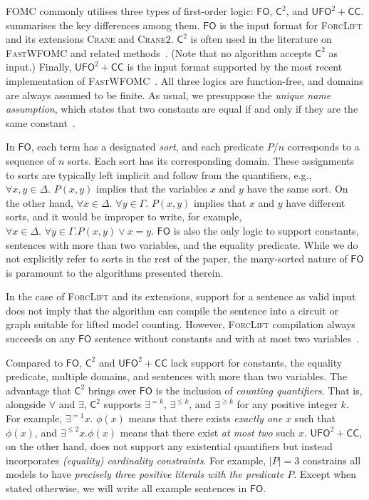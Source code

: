 \documentclass[a4paper,UKenglish,cleveref,autoref,table]{lipics-v2021}
\newcommand{\Cranetwo}{\textsc{Crane2}}
\newcommand{\Ctwo}{$\mathsf{C}^{2}$}
\newcommand{\FO}{$\mathsf{FO}$}
\newcommand{\UFO}{$\mathsf{UFO}^{2} + \mathsf{CC}$}
\begin{document}
FOMC commonly utilises three types of first-order logic: \FO{}, \Ctwo{}, and
\UFO{}.  summarises the key differences among them. \FO{} is
the input format for \textsc{ForcLift} and its extensions \textsc{Crane} and
\Cranetwo{}. \Ctwo{} is often used in the literature on \textsc{FastWFOMC} and
related methods~\cite{DBLP:journals/jair/Kuzelka21,DBLP:conf/aaai/MalhotraS22}.
(Note that no algorithm accepts \Ctwo{} as input.) Finally, \UFO{} is the input
format supported by the most recent implementation of
\textsc{FastWFOMC}~\cite{DBLP:conf/kr/TothK24}. All three logics are
function-free, and domains are always assumed to be finite. As usual, we
presuppose the \emph{unique name assumption}, which states that two constants
are equal if and only if they are the same constant~\cite{DBLP:books/aw/RN2020}.

In \FO{}, each term has a designated \emph{sort}, and each predicate $P/n$
corresponds to a sequence of $n$ sorts. Each sort has its corresponding domain.
These assignments to sorts are typically left implicit and follow from the
quantifiers, e.g., $\forall x,y \in \Delta\text{. }P(x, y)$ implies that the
variables $x$ and $y$ have the same sort. On the other hand,
$\forall x \in \Delta\text{. }\forall y \in \Gamma\text{. } P(x, y)$ implies
that $x$ and $y$ have different sorts, and it would be improper to write, for
example, $\forall x \in \Delta\text{. }\forall y \in \Gamma\text{.
} P(x, y) \lor x = y$. \FO{} is also the only logic to support constants,
sentences with more than two variables, and the equality predicate. While we do
not explicitly refer to sorts in the rest of the paper, the many-sorted nature
of \FO{} is paramount to the algorithms presented therein.

\begin{remark*}
  In the case of \textsc{ForcLift} and its extensions, support for a sentence as
  valid input does not imply that the algorithm can compile the sentence into a
  circuit or graph suitable for lifted model counting. However,
  \textsc{ForcLift} compilation always succeeds on any \FO{} sentence without
  constants and with at most two
  variables~\cite{DBLP:conf/nips/Broeck11,DBLP:conf/kr/BroeckMD14}.
\end{remark*}

Compared to \FO{}, \Ctwo{} and \UFO{} lack support for constants, the equality
predicate, multiple domains, and sentences with more than two variables. The
advantage that \Ctwo{} brings over \FO{} is the inclusion of \emph{counting
  quantifiers}. That is, alongside $\forall$ and $\exists$, \Ctwo{} supports
$\exists^{=k}$, $\exists^{\le k}$, and $\exists^{\ge k}$ for any positive
integer $k$. For example, $\exists^{=1} x\text{. }\phi(x)$ means that there
exists \emph{exactly one} $x$ such that $\phi(x)$, and $\exists^{\le 2} x\text{.
}\phi(x)$ means that there exist \emph{at most two} such $x$. \UFO{}, on the
other hand, does not support any existential quantifiers but instead
incorporates \emph{(equality) cardinality constraints}. For example, $|P| = 3$
constrains all models to have \emph{precisely three positive literals with the
  predicate $P$}. Except when stated otherwise, we will write all example
sentences in \FO{}.
\end{document}
